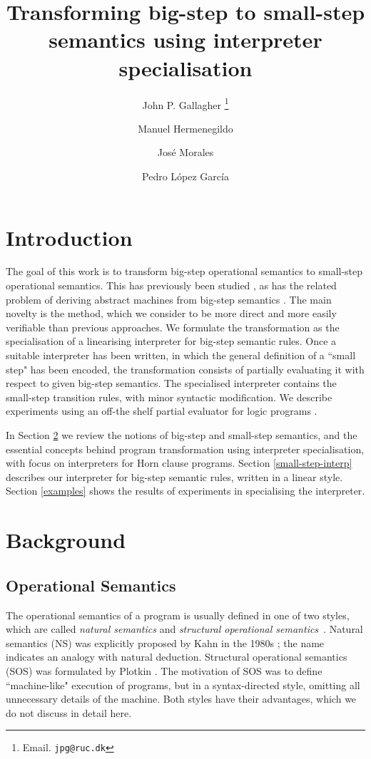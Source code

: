 \documentclass{llncs}
\title{Transforming big-step to small-step semantics using interpreter specialisation}
\author{John P. Gallagher \thanks{Email. \texttt{jpg@ruc.dk}}\inst{1}\inst{2}
\and
Manuel Hermenegildo\inst{2}  \and Jos\'e Morales
\inst{2} \and Pedro L\'opez Garc\'ia\inst{2} 
}
\institute{Roskilde University, Denmark
\and
IMDEA Software Institute, Madrid, Spain}
\begin{document}
\maketitle


\pagestyle{plain}
\pagestyle{myheadings}

\section{Introduction}

The goal of this work is to transform big-step operational semantics to small-step operational semantics.
This has previously been studied \cite{Vesely-Fisher,Hulzing,Ambal}, as has the related problem of deriving abstract
machines from big-step semantics \cite{Ager}. The main novelty is the method, which we consider to be more
direct and more easily verifiable than previous approaches.  We formulate the transformation as the specialisation of a
linearising interpreter for big-step semantic rules.  Once a suitable interpreter has been written, in which the general
definition of a ``small step" has been encoded, the transformation
consists of partially evaluating it with respect to given big-step semantics.  The specialised interpreter contains the 
small-step transition rules, 
with minor syntactic modification. We describe experiments using an off-the shelf partial evaluator 
for logic programs \cite{Logen}.

In Section \ref{background} we review the notions of big-step and small-step semantics, and
the essential concepts behind program transformation using interpreter specialisation, with focus on interpreters for
Horn clause programs. Section \ref{small-step-interp} describes our interpreter for big-step semantic rules,
written in a linear style. Section \ref{examples} shows the results of experiments in specialising the interpreter.

\section{Background}\label{background}

\subsection{Operational Semantics}
The operational semantics of a program is usually defined in one of two styles, 
which are called \emph{natural semantics} and \emph{structural operational semantics}~\cite{NielsonN1992}.
Natural semantics (NS) was explicitly proposed by Kahn in the 
1980s \cite{Kahn87}; the name indicates an analogy with natural deduction. 
Structural operational semantics (SOS) was formulated by Plotkin \cite{Plotkin1981,Plotkin04,Plotkin04a}.  
The motivation of SOS was to define
``machine-like" execution of programs, but in a syntax-directed style, omitting all unnecessary details of
the machine.  Both styles have their advantages, which we do not discuss in detail here.
\end{document}
